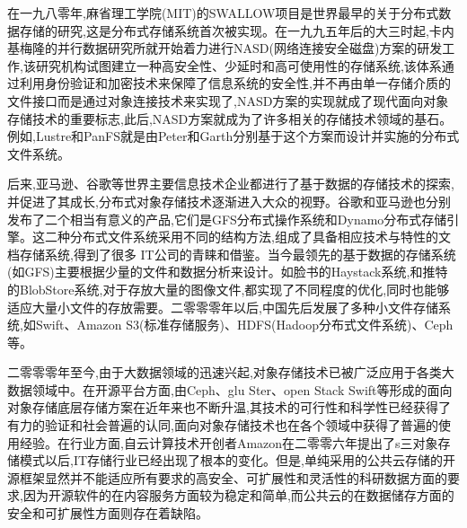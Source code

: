 
在一九八零年,麻省理工学院(MIT)的SWALLOW项目是世界最早的关于分布式数据存储的研究,这是分布式存储系统首次被实现。在一九九五年后的大三时起,卡内基梅隆的并行数据研究所就开始着力进行NASD(网络连接安全磁盘)方案的研发工作,该研究机构试图建立一种高安全性、少延时和高可使用性的存储系统,该体系通过利用身份验证和加密技术来保障了信息系统的安全性,并不再由单一存储介质的文件接口而是通过对象连接技术来实现了,NASD方案的实现就成了现代面向对象存储技术的重要标志,此后,NASD方案就成为了许多相关的存储技术领域的基石。例如,Lustre和PanFS就是由Peter和Garth分别基于这个方案而设计并实施的分布式文件系统。

后来,亚马逊、谷歌等世界主要信息技术企业都进行了基于数据的存储技术的探索,并促进了其成长,分布式对象存储技术逐渐进入大众的视野。谷歌和亚马逊也分别发布了二个相当有意义的产品,它们是GFS分布式操作系统和Dynamo分布式存储引擎。这二种分布式文件系统采用不同的结构方法,组成了具备相应技术与特性的文档存储系统,得到了很多 IT公司的青睐和借鉴。当今最领先的基于数据的存储系统(如GFS)主要根据少量的文件和数据分析来设计。如脸书的Haystack系统,和推特的BlobStore系统,对于存放大量的图像文件,都实现了不同程度的优化,同时也能够适应大量小文件的存放需要。二零零零年以后,中国先后发展了多种小文件存储系统,如Swift、Amazon S3(标准存储服务)、HDFS(Hadoop分布式文件系统)、Ceph等。

二零零零年至今,由于大数据领域的迅速兴起,对象存储技术已被广泛应用于各类大数据领域中。在开源平台方面,由Ceph、glu Ster、open Stack Swift等形成的面向对象存储底层存储方案在近年来也不断升温,其技术的可行性和科学性已经获得了有力的验证和社会普遍的认同,面向对象存储技术也在各个领域中获得了普遍的使用经验。在行业方面,自云计算技术开创者Amazon在二零零六年提出了s三对象存储模式以后,IT存储行业已经出现了根本的变化。但是,单纯采用的公共云存储的开源框架显然并不能适应所有要求的高安全、可扩展性和灵活性的科研数据方面的要求,因为开源软件的在内容服务方面较为稳定和简单,而公共云的在数据储存方面的安全和可扩展性方面则存在着缺陷。


